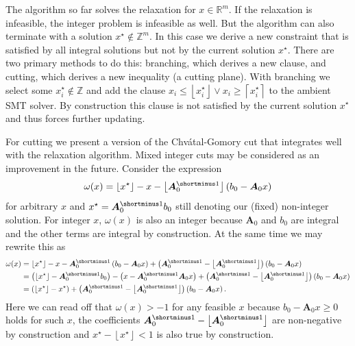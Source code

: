 \documentclass[a4paper, 12pt]{article}
\newcommand{\R} {\mathbb{R}}
\newcommand{\Z} {\mathbb{Z}}
\newcommand{\minv} { {\shortminus1} }
\newcommand{\floor}[1]{\left\lfloor #1 \right\rfloor}
\newcommand{\ceil}[1]{\left\lceil #1 \right\rceil}
\newcommand{\stared}[1]{#1^\star}
\begin{document}
The algorithm so far solves the relaxation for $x \in \R^m$. If the relaxation is infeasible, the integer problem is infeasible as well. But the algorithm can also terminate with a solution $\stared{x} \notin \Z^m$. In this case we derive a new constraint that is satisfied by all integral solutions but not by the current solution $\stared{x}$. There are two primary methods to do this: branching, which derives a new clause, and cutting, which derives a new inequality (a cutting plane). With branching we select some $\stared{x}_i \notin \Z$ and add the clause $x_i \leq \floor{\stared{x}_i} \lor x_i \geq \ceil{\stared{x}_i}$ to the ambient SMT solver. By construction this clause is not satisfied by the current solution $\stared{x}$ and thus forces further updating.

For cutting we present a version of the Chvátal-Gomory cut that integrates well with the relaxation algorithm. Mixed integer cuts may be considered as an improvement in the future.
Consider the expression
\begin{equation*}
\omega(x) = \floor{\stared{x}} - x - \floor{\bm{A}_0^\minv} \left(b_0 - \bm{A}_0 x\right)
\end{equation*}
for arbitrary $x$ and $\stared{x} = \bm{A}_0^\minv b_0$ still denoting our (fixed) non-integer solution. For integer $x$, $\omega(x)$ is also an integer because $\bm{A}_0$ and $b_0$ are integral and the other terms are integral by construction.
At the same time we may rewrite this as
\begin{align*}
\omega(x)
&= \floor{\stared{x}} - x - \bm{A}_0^\minv \left(b_0 - \bm{A}_0 x\right) + \left(\bm{A}_0^\minv - \floor{\bm{A}_0^\minv}\right) \left(b_0 - \bm{A}_0 x\right) \\
&= \left(\floor{\stared{x}} - \bm{A}_0^\minv b_0\right) - \left(x - \bm{A}_0^\minv \bm{A}_0 x\right) + \left(\bm{A}_0^\minv - \floor{\bm{A}_0^\minv}\right) \left(b_0 - \bm{A}_0 x\right) \\
&= \left(\floor{\stared{x}} - \stared{x}\right) + \left(\bm{A}_0^\minv - \floor{\bm{A}_0^\minv}\right) \left(b_0 - \bm{A}_0 x\right).
\end{align*}
Here we can read off that $\omega(x) > -1$ for any feasible $x$ because $b_0 - \bm{A}_0 x \geq 0$ holds for such $x$, the coefficients $\bm{A}_0^\minv - \floor{\bm{A}_0^\minv}$ are non-negative by construction and $\stared{x} - \floor{\stared{x}} < 1$ is also true by construction.
\end{document}
